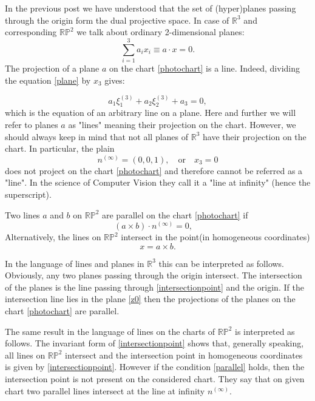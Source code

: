 \documentclass[a4paper,10pt]{article}
\begin{document}
In the previous post we have understood that the set of (hyper)planes passing through the origin form the dual projective space. In case of $\mathbb{R}^3$ and corresponding $\mathbb{RP}^2$ we talk about ordinary 2-dimensional planes:
\begin{equation}
 \sum\limits_{i=1}^3 a_i x_i \equiv a\cdot x= 0. \label{plane}
\end{equation}
The projection of a plane $a$ on the chart \eqref{photochart} is a line. Indeed, dividing the equation \eqref{plane} by $x_3$ gives:

\begin{equation}
 a_1 \xi_1^{(3)} + a_2 \xi_2^{(3)} + a_3= 0,
\end{equation}
which is the equation of an arbitrary line on a plane.
Here and further we will refer to planes $a$ as "lines" meaning their projection on the  chart. However, we should always keep in mind that not all planes of $\mathbb{R}^3$ have their projection on the chart. In particular, the plain 
\begin{equation}
n^{(\infty)} = (0,0,1), \quad \text{or} \quad x_3 = 0\label{z0}
\end{equation}
does not project on the chart \eqref{photochart} and therefore cannot be referred as a "line". In the science of Computer Vision they call it a "line at infinity" (hence the superscript).

Two lines $a$ and $b$ on $\mathbb{RP}^2$  are parallel on the chart  \eqref{photochart} if 
\begin{equation}
(a\times b )\cdot n^{(\infty)} = 0, \quad \label{parallel}
\end{equation}
Alternatively, the lines on $\mathbb{RP}^2$ intersect in the point(in homogeneous coordinates)
\begin{equation}
x = a \times b.\label{intersectionpoint}
\end{equation}

In the language of lines and planes in $\mathbb{R}^3$ this can be interpreted as follows. Obviously, any two planes passing through the origin intersect. The intersection of the planes is the line passing through \eqref{intersectionpoint} and the origin. If the intersection line lies in the plane \eqref{z0} then the projections of the planes on the chart \eqref{photochart} are parallel.

The same result in the language of lines on the charts of $\mathbb{RP}^2$ is interpreted as  follows. The invariant form of \eqref{intersectionpoint} shows that, generally speaking, all lines on $\mathbb{RP}^2$ intersect and the intersection point in homogeneous coordinates is given by \eqref{intersectionpoint}. However if the condition \eqref{parallel} holds, then the intersection point is not  present on the considered chart. They say that on given chart two parallel lines intersect at the line at infinity $n^{(\infty)}$.
\end{document}
